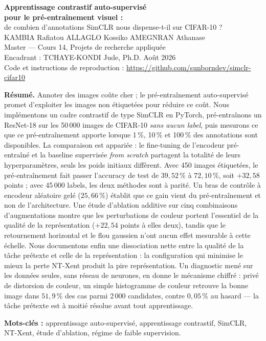 \documentclass[11pt,a4paper]{article}
\newcommand{\membreKR}{KAMBIA Rafiatou}
\newcommand{\membreAK}{ALLAGLO Kossiko}
\newcommand{\membreAA}{AMEGNRAN Athanase}
\newcommand{\lienDepot}{https://github.com/sunborndev/simclr-cifar10}
\begin{document}
\begin{center}
{\LARGE\bfseries Apprentissage contrastif auto-supervisé\\[2pt]
pour le pré-entraînement visuel :}\\[6pt]
{\large de combien d'annotations SimCLR nous dispense-t-il sur CIFAR-10 ?}\\[14pt]

{\large \membreKR{} \quad\textbullet\quad \membreAK{} \quad\textbullet\quad \membreAA{}}\\[4pt]
{\small Master --- Cours 14, Projets de recherche appliquée\\
Encadrant : TCHAYE-KONDI Jude, Ph.D. \quad\textbullet\quad Août 2026}\\[4pt]
{\small Code et instructions de reproduction : \url{\lienDepot}}
\end{center}
\vspace{6pt}

\noindent\colorbox{fondgris}{%
\parbox{\dimexpr\textwidth-2\fboxsep}{\small
\textbf{Résumé.} Annoter des images coûte cher ; le pré-entraînement auto-supervisé promet
d'exploiter les images non étiquetées pour réduire ce coût. Nous implémentons un cadre
contrastif de type SimCLR en PyTorch, pré-entraînons un ResNet-18 sur les 50\,000 images
de CIFAR-10 \emph{sans aucun label}, puis mesurons ce que ce pré-entraînement apporte
lorsque 1\,\%, 10\,\% et 100\,\% des annotations sont disponibles. La comparaison est
appariée : le fine-tuning de l'encodeur pré-entraîné et la baseline supervisée
\emph{from scratch} partagent la totalité de leurs hyperparamètres, seuls les poids
initiaux diffèrent. Avec 450 images étiquetées, le pré-entraînement fait passer
l'accuracy de test de $39{,}52\,\%$ à $72{,}10\,\%$, soit $+32{,}58$ points ; avec
45\,000 labels, les deux méthodes sont à parité. Un bras de contrôle à encodeur aléatoire
gelé ($25{,}66\,\%$) établit que ce gain vient du pré-entraînement et non de
l'architecture. Une étude d'ablation additive sur cinq combinaisons d'augmentations
montre que les perturbations de couleur portent l'essentiel de la qualité de la
représentation ($+22{,}54$ points à elles deux), tandis que le retournement horizontal et
le flou gaussien n'ont aucun effet mesurable à cette échelle. Nous documentons enfin une
dissociation nette entre la qualité de la tâche prétexte et celle de la représentation :
la configuration qui minimise le mieux la perte NT-Xent produit la pire représentation. Un
diagnostic mené sur les données seules, sans réseau de neurones, en donne le mécanisme
chiffré : privé de distorsion de couleur, un simple histogramme de couleur retrouve la
bonne image dans $51{,}9\,\%$ des cas parmi 2\,000 candidates, contre $0{,}05\,\%$ au
hasard --- la tâche prétexte est à moitié résolue avant tout apprentissage.
\medskip

\noindent\textbf{Mots-clés :} apprentissage auto-supervisé, apprentissage contrastif,
SimCLR, NT-Xent, étude d'ablation, régime de faible supervision.
}}
\end{document}
